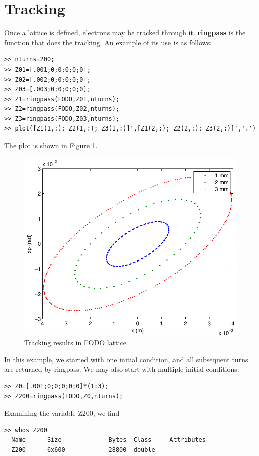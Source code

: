 \documentclass[acus]{article}
\newcommand{\mfun}[1]{{\bf{#1}}}
\begin{document}
\section{Tracking}
Once a lattice is defined, electrons may be tracked through it.  \mfun{ringpass} is the
function that does the tracking.  An example of its use is as follows:
\begin{verbatim}
>> nturns=200;
>> Z01=[.001;0;0;0;0;0];
>> Z02=[.002;0;0;0;0;0];
>> Z03=[.003;0;0;0;0;0];
>> Z1=ringpass(FODO,Z01,nturns);
>> Z2=ringpass(FODO,Z02,nturns);
>> Z3=ringpass(FODO,Z03,nturns);
>> plot([Z1(1,:); Z2(1,:); Z3(1,:)]',[Z1(2,:); Z2(2,:); Z3(2,:)]','.')
\end{verbatim}
The plot is shown in Figure \ref{trackPlot}.
\begin{figure}[htb]
\centering
\includegraphics[scale=0.5]{trackPlot.pdf}
\caption{Tracking results in FODO lattice.}
\label{trackPlot}
\end{figure}
In this example, we started with one initial condition, and all subsequent 
turns
are returned by ringpass.  We may also start with multiple initial conditions:
\begin{verbatim}
>> Z0=[.001;0;0;0;0;0]*(1:3);
>> Z200=ringpass(FODO,Z0,nturns);
\end{verbatim}
Examining the variable Z200, we find
\begin{verbatim}
>> whos Z200
  Name      Size             Bytes  Class     Attributes
  Z200      6x600            28800  double
\end{verbatim}
\end{document}
